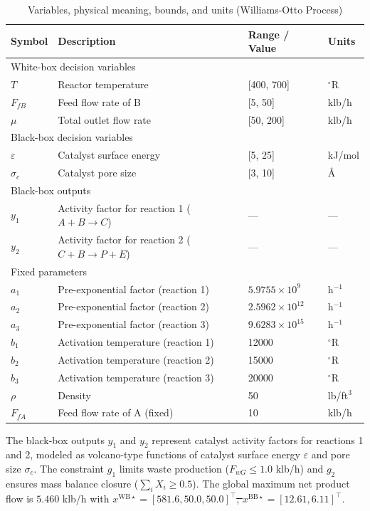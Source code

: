 \documentclass[12pt,a4paper]{article}%
\theoremstyle{plain}%
\theoremstyle{remark}%
\theoremstyle{definition}%
\def\WB{\mathrm{WB}}
\def\BB{\mathrm{BB}}
\providecommand{\DIFaddtex}[1]{{\protect\color{blue}\uwave{#1}}} %
\providecommand{\DIFdeltex}[1]{{\protect\color{red}\sout{#1}}}                      %
\providecommand{\DIFaddbegin}{} %
\providecommand{\DIFaddend}{} %
\providecommand{\DIFdelbegin}{} %
\providecommand{\DIFdelend}{} %
\providecommand{\DIFadd}[1]{\texorpdfstring{\DIFaddtex{#1}}{#1}} %
\providecommand{\DIFdel}[1]{\texorpdfstring{\DIFdeltex{#1}}{}} %
\newcommand{\DIFscaledelfig}{0.5}
\newlength{\DIFdelgraphicswidth} %
\newlength{\DIFdelgraphicsheight} %
\newcommand{\DIFaddincludegraphics}[2][]{{\color{blue}\fbox{\DIFOincludegraphics[#1]{#2}}}} %
\newcommand{\DIFdelincludegraphics}[2][]{%
\sbox{\DIFdelgraphicsbox}{\DIFOincludegraphics[#1]{#2}}%
\settoboxwidth{\DIFdelgraphicswidth}{\DIFdelgraphicsbox} %
\settoboxtotalheight{\DIFdelgraphicsheight}{\DIFdelgraphicsbox} %
\scalebox{\DIFscaledelfig}{%
\parbox[b]{\DIFdelgraphicswidth}{\usebox{\DIFdelgraphicsbox}\\[-\baselineskip] \rule{\DIFdelgraphicswidth}{0em}}\llap{\resizebox{\DIFdelgraphicswidth}{\DIFdelgraphicsheight}{%
\setlength{\unitlength}{\DIFdelgraphicswidth}%
\begin{picture}(1,1)%
\thicklines\linethickness{2pt} %
{\color[rgb]{1,0,0}\put(0,0){\framebox(1,1){}}}%
{\color[rgb]{1,0,0}\put(0,0){\line( 1,1){1}}}%
{\color[rgb]{1,0,0}\put(0,1){\line(1,-1){1}}}%
\end{picture}%
}\hspace*{3pt}}} %
} %
\DeclareRobustCommand{\DIFaddbegin}{\DIFOaddbegin \let\includegraphics\DIFaddincludegraphics} %
\DeclareRobustCommand{\DIFaddend}{\DIFOaddend \let\includegraphics\DIFOincludegraphics} %
\DeclareRobustCommand{\DIFdelbegin}{\DIFOdelbegin \let\includegraphics\DIFdelincludegraphics} %
\DeclareRobustCommand{\DIFdelend}{\DIFOaddend \let\includegraphics\DIFOincludegraphics} %
\begin{document}
\begin{appendices}
{}\DIFaddend 

\begin{table}[htbp]
\centering
\caption{Variables, physical meaning, bounds, and units (Williams-Otto Process)}
\label{tab:williams_otto_vars}
\begin{tabular}{@{}llll@{}}
\toprule
\textbf{Symbol} & \textbf{Description} & \textbf{Range / Value} & \textbf{Units} \\
\midrule
\multicolumn{4}{l}{White-box decision variables} \\
\midrule
$T$ & Reactor temperature & [400, 700] & $^\circ$R \\
$F_{fB}$ & Feed flow rate of B & [5, 50] & klb/h \\
$\mu$ & Total outlet flow rate & [50, 200] & klb/h \\
\midrule
\multicolumn{4}{l}{Black-box decision variables} \\
\midrule
$\varepsilon$ & Catalyst surface energy & [5, 25] & kJ/mol \\
$\sigma_c$ & Catalyst pore size & [3, 10] & \AA \\
\midrule
\multicolumn{4}{l}{Black-box outputs} \\
\midrule
$y_1$ & Activity factor for reaction 1 ($A + B \to C$) & --- & --- \\
$y_2$ & Activity factor for reaction 2 ($C + B \to P + E$) & --- & --- \\
\midrule
\multicolumn{4}{l}{Fixed parameters} \\
\midrule
$a_1$ & Pre-exponential factor (reaction 1) & $5.9755 \times 10^9$ & h$^{-1}$ \\
$a_2$ & Pre-exponential factor (reaction 2) & $2.5962 \times 10^{12}$ & h$^{-1}$ \\
$a_3$ & Pre-exponential factor (reaction 3) & $9.6283 \times 10^{15}$ & h$^{-1}$ \\
$b_1$ & Activation temperature (reaction 1) & 12000 & $^\circ$R \\
$b_2$ & Activation temperature (reaction 2) & 15000 & $^\circ$R \\
$b_3$ & Activation temperature (reaction 3) & 20000 & $^\circ$R \\
$\rho$ & Density & 50 & lb/ft$^3$ \\
$F_{fA}$ & Feed flow rate of A (fixed) & 10 & klb/h \\
\bottomrule
\end{tabular}
\end{table}

The black-box outputs $y_1$ and $y_2$ represent catalyst activity factors for reactions 1 and 2, modeled as volcano-type functions of catalyst surface energy $\varepsilon$ and pore size $\sigma_c$. The constraint $g_1$ limits waste production ($F_{wG} \leq 1.0$ klb/h) and $g_2$ ensures mass balance closure ($\sum_i X_i \geq 0.5$). The global maximum net product flow is \DIFdelbegin \DIFdel{$5.460$ }\DIFdelend \DIFaddbegin \DIFadd{$5.470$ }\DIFaddend klb/h with \DIFdelbegin \DIFdel{$x^{\WB\star} = [581.6, 50.0, 50.0]^\top$, $x^{\BB\star} = [12.61, 6.11]^\top$}\DIFdelend \DIFaddbegin \DIFadd{$x^{\WB\star} = [581.9, 50.0, 50.0]^\top$, $x^{\BB\star} = [12.6, 6.11]^\top$}\DIFaddend .


\end{appendices}
\end{document}
